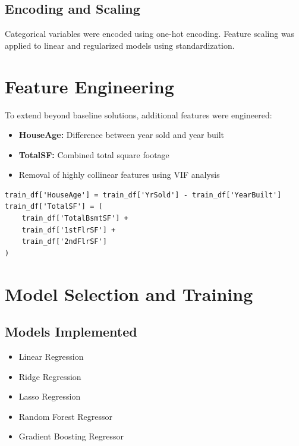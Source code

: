 \documentclass[a4paper]{article}
\begin{document}
\subsection*{Encoding and Scaling}

Categorical variables were encoded using one-hot encoding. Feature scaling was applied to linear and regularized models using standardization.

\section*{Feature Engineering}

To extend beyond baseline solutions, additional features were engineered:

\begin{itemize}
    \item \textbf{HouseAge:} Difference between year sold and year built
    \item \textbf{TotalSF:} Combined total square footage
    \item Removal of highly collinear features using VIF analysis
\end{itemize}

\begin{verbatim}
train_df['HouseAge'] = train_df['YrSold'] - train_df['YearBuilt']
train_df['TotalSF'] = (
    train_df['TotalBsmtSF'] +
    train_df['1stFlrSF'] +
    train_df['2ndFlrSF']
)
\end{verbatim}

\section*{Model Selection and Training}

\subsection*{Models Implemented}

\begin{itemize}
    \item Linear Regression
    \item Ridge Regression
    \item Lasso Regression
    \item Random Forest Regressor
    \item Gradient Boosting Regressor
\end{itemize}
\end{document}
